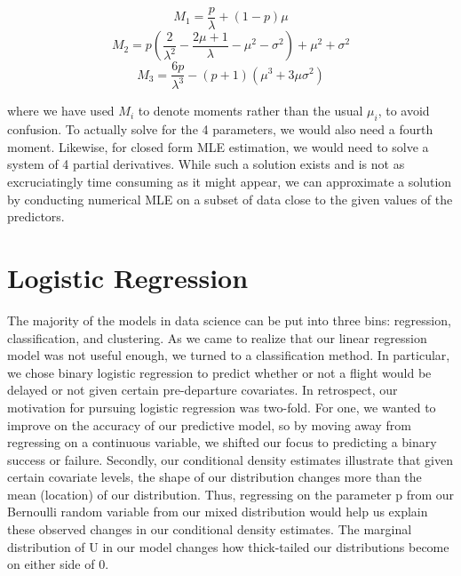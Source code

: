 \documentclass[12pt, a4paper, openany]{book}
\newcommand\tab[1][1cm]{\hspace*{#1}}
\begin{document}
	\begin{center}
	$$M_1 = \frac{p}{\lambda} +(1- p)\mu$$
	$$M_2 = p\left(\frac{2}{\lambda^2} - \frac{2\mu+1}{\lambda} - \mu^2 - \sigma^2\right) +\mu^2 +\sigma^2$$
	$$M_3 = \frac{6p}{\lambda^3} -(p+1)(\mu^3 + 3\mu\sigma^2) $$
	\end{center} 
	where we have used $M_i$ to denote moments rather than the usual $\mu_i$, to avoid confusion. To actually solve for the 4 parameters, we would also need a fourth moment. Likewise, for closed form MLE estimation, we would need to solve a system of 4 partial derivatives. While such a solution exists and is not as excruciatingly time consuming as it might appear, we can approximate a solution by conducting numerical MLE on a subset of data close to the given values of the predictors. 
	\section{Logistic Regression}
	\tab The majority of the models in data science can be put into three bins: regression, classification, and clustering. As we came to realize that our linear regression model was not useful enough, we turned to a classification method. In particular, we chose binary logistic regression to predict whether or not a flight would be delayed or not given certain pre-departure covariates. In retrospect, our motivation for pursuing logistic regression was two-fold. For one, we wanted to improve on the accuracy of our predictive model, so by moving away from regressing on a continuous variable, we shifted our focus to predicting a binary success or failure. Secondly, our conditional density estimates illustrate that given certain covariate levels, the shape of our distribution changes more than the mean (location) of our distribution. Thus, regressing on the parameter p from our Bernoulli random variable from our mixed distribution would help us explain these observed changes in our conditional density estimates. The marginal distribution of U in our model changes how thick-tailed our distributions become on either side of 0. \\
\end{document}
